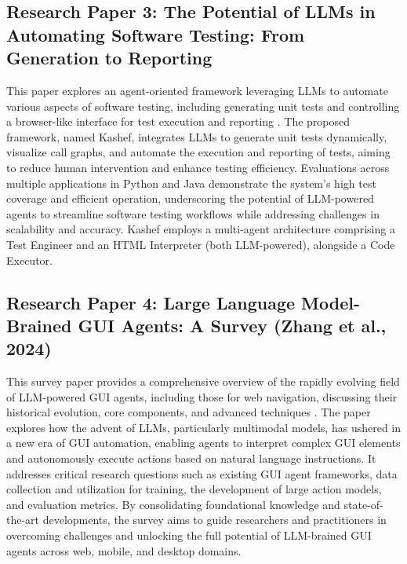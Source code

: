 \documentclass[conference]{IEEEtran}
\begin{document}
\subsection{Research Paper 3: The Potential of LLMs in Automating Software Testing: From Generation to Reporting}
This paper explores an agent-oriented framework leveraging LLMs to automate various aspects of software testing, including generating unit tests and controlling a browser-like interface for test execution and reporting \cite{llm_testing2024, llm_testing_arxiv2024}. The proposed framework, named Kashef, integrates LLMs to generate unit tests dynamically, visualize call graphs, and automate the execution and reporting of tests, aiming to reduce human intervention and enhance testing efficiency. Evaluations across multiple applications in Python and Java demonstrate the system's high test coverage and efficient operation, underscoring the potential of LLM-powered agents to streamline software testing workflows while addressing challenges in scalability and accuracy. Kashef employs a multi-agent architecture comprising a Test Engineer and an HTML Interpreter (both LLM-powered), alongside a Code Executor.

\subsection{Research Paper 4: Large Language Model-Brained GUI Agents: A Survey (Zhang et al., 2024)}
This survey paper provides a comprehensive overview of the rapidly evolving field of LLM-powered GUI agents, including those for web navigation, discussing their historical evolution, core components, and advanced techniques \cite{zhang2024survey}. The paper explores how the advent of LLMs, particularly multimodal models, has ushered in a new era of GUI automation, enabling agents to interpret complex GUI elements and autonomously execute actions based on natural language instructions. It addresses critical research questions such as existing GUI agent frameworks, data collection and utilization for training, the development of large action models, and evaluation metrics. By consolidating foundational knowledge and state-of-the-art developments, the survey aims to guide researchers and practitioners in overcoming challenges and unlocking the full potential of LLM-brained GUI agents across web, mobile, and desktop domains.
\end{document}
